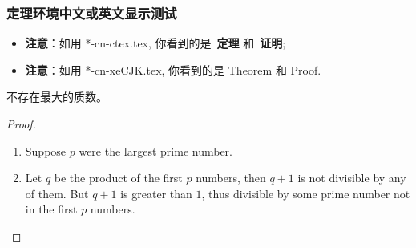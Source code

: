 \begin{frame}
  \frametitle{定理环境中文或英文显示测试}
  \begin{itemize}
      \item {\bf 注意}：如用 *-cn-ctex.tex,
         你看到的是~{\bf 定理} 和~{\bf 证明};
      \item {\bf 注意}：如用 *-cn-xeCJK.tex, 你看到的是 Theorem 和 Proof.
  \end{itemize}

  \begin{theorem}
    不存在最大的质数。
  \end{theorem}
  \begin{proof}
    \begin{enumerate}
    \item Suppose $p$ were the largest prime number.
    \item Let $q$ be the product of the first $p$ numbers,
    then $q + 1$ is not divisible by any of them.
    But $q + 1$ is greater than $1$, thus divisible by some prime
      number not in the first $p$ numbers.\qedhere
    \end{enumerate}
  \end{proof}
\end{frame}
